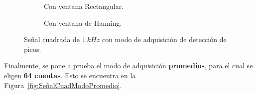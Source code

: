 \begin{figure}[H]
\begin{subfigure}[H]{0.40\textwidth}
        \caption{Con ventana Rectangular.}
      \end{subfigure}
      \hfill 
      \begin{subfigure}[H]{0.40\textwidth}
        \caption{Con ventana de Hanning.}
      \end{subfigure}

      \caption{Señal cuadrada de $1~kHz$ con modo de adquisición de detección de picos.}
      \label{fig:SeñalCuadModoDetecPicos}
    \end{figure}

    Finalmente, se pone a prueba el modo de adquisición \textbf{promedios}, para el cual se eligen
    \textbf{64 cuentas}. Esto se encuentra en la Figura~\ref{fig:SeñalCuadModoPromedio}.

